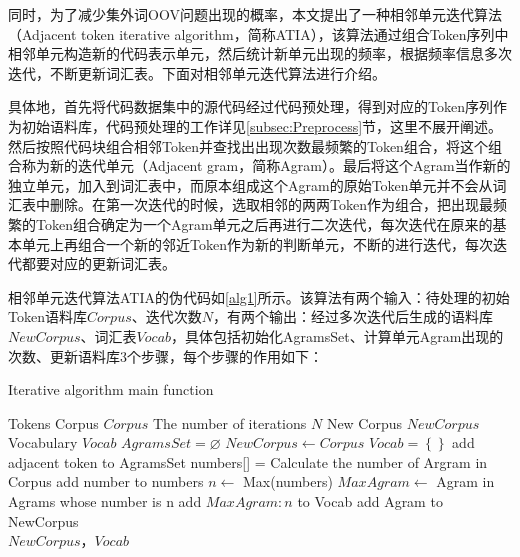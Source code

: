 同时，为了减少集外词OOV问题出现的概率，本文提出了一种相邻单元迭代算法（Adjacent token iterative algorithm，简称ATIA），该算法通过组合Token序列中相邻单元构造新的代码表示单元，然后统计新单元出现的频率，根据频率信息多次迭代，不断更新词汇表。下面对相邻单元迭代算法进行介绍。

具体地，首先将代码数据集中的源代码经过代码预处理，得到对应的Token序列作为初始语料库，代码预处理的工作详见\ref{subsec:Preprocess}节，这里不展开阐述。然后按照代码块组合相邻Token并查找出出现次数最频繁的Token组合，将这个组合称为新的迭代单元（Adjacent gram，简称Agram）。最后将这个Agram当作新的独立单元，加入到词汇表中，而原本组成这个Agram的原始Token单元并不会从词汇表中删除。在第一次迭代的时候，选取相邻的两两Token作为组合，把出现最频繁的Token组合确定为一个Agram单元之后再进行二次迭代，每次迭代在原来的基本单元上再组合一个新的邻近Token作为新的判断单元，不断的进行迭代，每次迭代都要对应的更新词汇表。

相邻单元迭代算法ATIA的伪代码如\ref{alg1}所示。该算法有两个输入：待处理的初始Token语料库$Corpus$、迭代次数$N$，有两个输出：经过多次迭代后生成的语料库$NewCorpus$、词汇表$Vocab$，具体包括初始化AgramsSet、计算单元Agram出现的次数、更新语料库3个步骤，每个步骤的作用如下：

\begin{algorithm}[ht]  
	\renewcommand{\algorithmicrequire}{\textbf{Input:}}
	\renewcommand{\algorithmicensure}{\textbf{Output:}}
	\caption{Iterative algorithm main function}  
	\label{alg1}
	\begin{algorithmic}[1]
    \Require Tokens Corpus $Corpus$
    \Require The number of iterations $N$
		\Ensure New Corpus $NewCorpus$
    \Ensure Vocabulary $Vocab$
    \State $AgramsSet = \varnothing $ 
    \State $NewCorpus \leftarrow Corpus $ 
    \State $Vocab = \left\{\right\} $  
          \State add adjacent token to AgramsSet
        \EndFor 
      \Else
        \State numbers[] = {} 
          \State Calculate the number of Argram in Corpus 
          \State add number to numbers  
        \EndFor 
        \State $n \leftarrow $ Max(numbers) 
        \State $MaxAgram \leftarrow$ Agram in Agrams whose number is n
        \State add $MaxAgram:n$ to Vocab 
        \State add Agram to NewCorpus 
      \EndIf
    \EndFor \\
    \Return $NewCorpus$，$Vocab$ 
	\end{algorithmic}
\end{algorithm}

